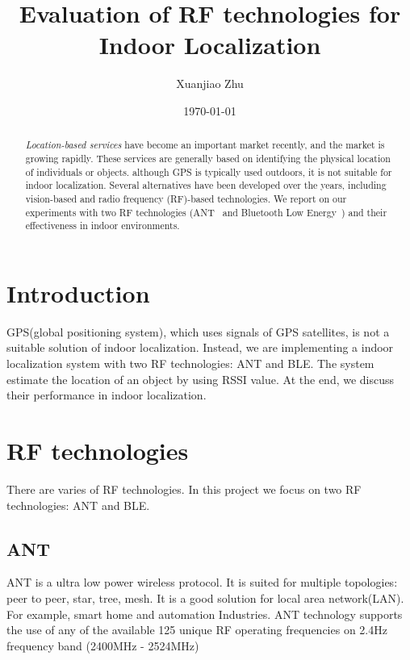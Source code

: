 \documentclass{article}
\title{Evaluation of RF technologies for Indoor Localization}
\author{Xuanjiao Zhu}
\date{\today}
\begin{document}
\begin{titlingpage}

\maketitle

\begin{abstract}
\textit{Location-based services} have become an important market recently, and the market is growing rapidly. These services are generally based on identifying the physical location of individuals or objects. although GPS is typically used outdoors, it is not suitable for indoor localization. Several alternatives have been developed over the years, including vision-based and radio frequency (RF)-based technologies. We report on our experiments with two RF technologies (ANT~\cite{ANT} and Bluetooth Low Energy~\cite{BT}) and their effectiveness in indoor environments.
\end{abstract}

\end{titlingpage}

\section{Introduction}
GPS(global positioning system), which uses signals of GPS satellites, is not a suitable solution of indoor localization. Instead, we are implementing a indoor localization system with two RF technologies: ANT and BLE. The system estimate the location of an object by using RSSI value. At the end, we discuss their performance in indoor localization.
\section{RF technologies}
There are varies of RF technologies. In this project we focus on two RF technologies: ANT and BLE.

\subsection{ANT}

ANT is a ultra low power wireless protocol. It is suited for multiple topologies: peer to peer, star, tree, mesh. It is a good solution for local area network(LAN). For example, smart home and automation Industries. ANT technology supports the use of any of the available 125 unique RF operating frequencies on 2.4Hz frequency band (2400MHz - 2524MHz)
\end{document}
